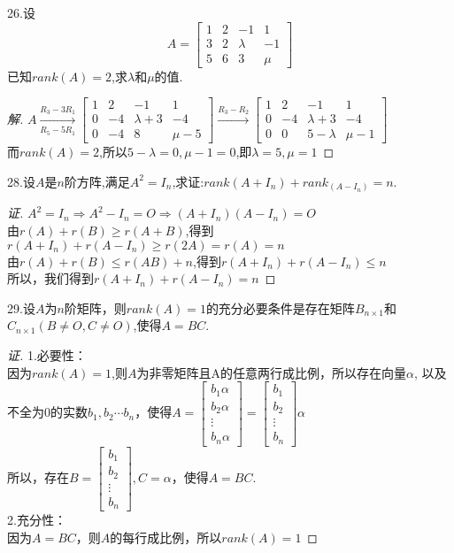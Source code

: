 \documentclass[10pt,a4paper]{report}
\begin{document}
\noindent 26.设
$$
A = \left[
\begin{matrix}
1 & 2 & -1 & 1\\
3 & 2 & \lambda & -1\\
5 & 6 & 3 & \mu
\end{matrix}
\right]
$$
已知$rank(A) = 2$,求$\lambda$和$\mu$的值.
\begin{proof}[解]
	$
	A \xrightarrow[R_{5}-5R_{1}]{R_{3}-3R_{1}} \left[
	\begin{matrix}
	1 & 2 & -1 & 1\\
	0 & -4 & \lambda + 3 & -4\\
	0 & -4 & 8 & \mu - 5
	\end{matrix}
	\right] \xrightarrow{R_{3} -R_{2}} \left[
	\begin{matrix}
	1 & 2 & -1 & 1\\
	0 & -4 & \lambda + 3 & -4\\
	0 & 0 & 5 - \lambda & \mu - 1
	\end{matrix}
	\right]
	$\\
	而$rank(A) = 2$,所以$5-\lambda = 0, \mu - 1 = 0$,即$\lambda = 5, \mu = 1$
\end{proof}
\noindent 28.设$A$是$n$阶方阵,满足$A^{2}=I_{n}$,求证:$rank(A+I_{n})+rank_(A-I_{n}) = n$.
\begin{proof}[证]
	$A^{2}=I_{n} \Rightarrow A^{2}-I_{n} = O \Rightarrow (A + I_{n})(A - I_{n}) = O$\\
	由$r(A) + r(B) \geq r(A + B)$,得到$r(A+I_{n})+r(A-I_{n}) \geq r(2A) = r(A) = n$\\
	由$r(A) + r(B) \leq r(AB)+n$,得到$r(A+I_{n})+r(A-I_{n}) \leq n$\\
	所以，我们得到$r(A+I_{n})+r(A-I_{n}) = n$
\end{proof}
\noindent 29.设$A$为$n$阶矩阵，则$rank(A)=1$的充分必要条件是存在矩阵$B_{n \times 1}$和$C_{n \times 1}(B \neq O, C \neq O)$,使得$A=BC$.
\begin{proof}[证]
	1.必要性：\\
	因为$rank(A) = 1$,则$A$为非零矩阵且A的任意两行成比例，所以存在向量$\alpha$, 以及不全为$0$的实数$b_{1}, b_{2} \cdots b_{n}$，使得$A = 
	\left[
	\begin{matrix}
	b_{1}\alpha\\
	b_{2}\alpha\\
	\vdots\\
	b_{n}\alpha
	\end{matrix}
	\right] = \left[
	\begin{matrix}
	b_{1}\\
	b_{2}\\
	\vdots\\
	b_{n}
	\end{matrix}
	\right] \alpha$\\
	所以，存在$B = \left[
	\begin{matrix}
	b_{1}\\
	b_{2}\\
	\vdots\\
	b_{n}
	\end{matrix}
	\right], C = \alpha$，使得$A=BC$.\\
	2.充分性：\\
	因为$A = BC$，则$A$的每行成比例，所以$rank(A) = 1$
\end{proof}
\end{document}
